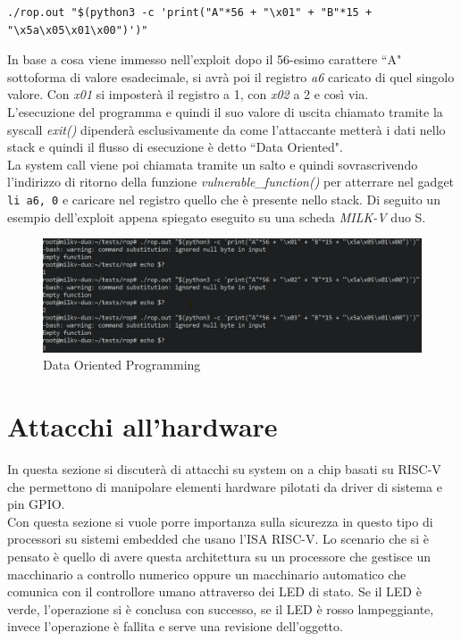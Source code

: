 \begin{verbatim}
./rop.out "$(python3 -c 'print("A"*56 + "\x01" + "B"*15 + "\x5a\x05\x01\x00")')"
\end{verbatim}
In base a cosa viene immesso nell'exploit dopo il 56-esimo carattere ``A" sottoforma di valore esadecimale, si avrà poi il registro \textit{a6} caricato di quel singolo valore. Con \textit{x01} si imposterà il registro a 1, con \textit{x02} a 2 e così via.\\L'esecuzione del programma e quindi il suo valore di uscita chiamato tramite la syscall \textit{exit()} dipenderà esclusivamente da come l'attaccante metterà i dati nello stack e quindi il flusso di esecuzione è detto ``Data Oriented".\\
La system call viene poi chiamata tramite un salto e quindi sovrascrivendo l'indirizzo di ritorno della funzione \textit{vulnerable\_function()} per atterrare nel gadget \texttt{li a6, 0} e caricare nel registro quello che è presente nello stack.
Di seguito un esempio dell'exploit appena spiegato eseguito su una scheda \textit{MILK-V} duo S.
\vspace{1cm}
\FloatBarrier
\begin{figure}[!htbp]
    \centering
    \includegraphics[width=1\linewidth]{images/exit_manipulation_stack.png}
    \caption{Data Oriented Programming}
\end{figure}
\FloatBarrier
\vspace{1cm}
\section*{Attacchi all'hardware}
In questa sezione si discuterà di attacchi su system on a chip basati su RISC-V che permettono di manipolare elementi hardware pilotati da driver di sistema e pin GPIO.\\
Con questa sezione si vuole porre importanza sulla sicurezza in questo tipo di processori su sistemi embedded che usano l'ISA RISC-V. Lo scenario che si è pensato è quello di avere questa architettura su un processore che gestisce un macchinario a controllo numerico oppure un macchinario automatico che comunica con il controllore umano attraverso dei LED di stato. Se il LED è verde, l'operazione si è conclusa con successo, se il LED è rosso lampeggiante, invece l'operazione è fallita e serve una revisione dell'oggetto.
